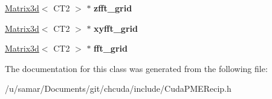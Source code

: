 \begin{DoxyCompactItemize}
\hypertarget{classCudaPMERecip_a9020023c824dbee5a04a39f62d6a4adc}{}\label{classCudaPMERecip_a9020023c824dbee5a04a39f62d6a4adc} 
\hyperlink{classMatrix3d}{Matrix3d}$<$ C\+T2 $>$ $\ast$ {\bfseries zfft\+\_\+grid}
\item 
\hypertarget{classCudaPMERecip_aa351fc06109560d4e4799647f0305e0d}{}\label{classCudaPMERecip_aa351fc06109560d4e4799647f0305e0d} 
\hyperlink{classMatrix3d}{Matrix3d}$<$ C\+T2 $>$ $\ast$ {\bfseries xyfft\+\_\+grid}
\item 
\hypertarget{classCudaPMERecip_ad55d7f051b50bf024eb02b9dacbc7f85}{}\label{classCudaPMERecip_ad55d7f051b50bf024eb02b9dacbc7f85} 
\hyperlink{classMatrix3d}{Matrix3d}$<$ C\+T2 $>$ $\ast$ {\bfseries fft\+\_\+grid}
\end{DoxyCompactItemize}


The documentation for this class was generated from the following file\+:\begin{DoxyCompactItemize}
\item 
/u/samar/\+Documents/git/chcuda/include/Cuda\+P\+M\+E\+Recip.\+h\end{DoxyCompactItemize}
